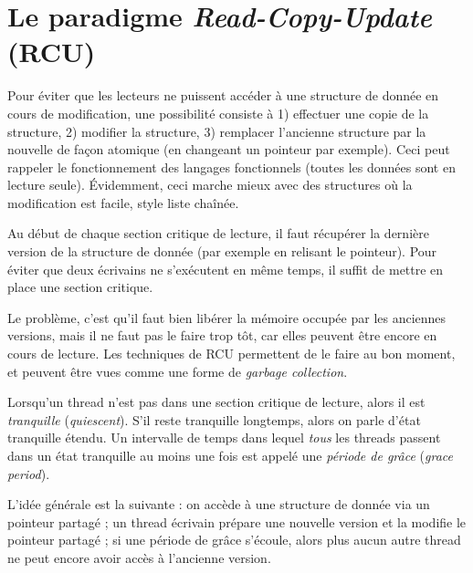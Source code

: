 \section{Le paradigme \emph{Read-Copy-Update} (RCU)}

Pour éviter que les lecteurs ne puissent accéder à une structure de donnée en
cours de modification, une possibilité consiste à 1) effectuer une copie de la
structure, 2) modifier la structure, 3) remplacer l'ancienne structure par la
nouvelle de façon atomique (en changeant un pointeur par exemple). Ceci peut
rappeler le fonctionnement des langages fonctionnels (toutes les données sont
\og en lecture seule\fg{}). Évidemment, ceci marche mieux avec des structures où
la modification est facile, style liste chaînée.

Au début de chaque section critique de lecture, il faut récupérer la dernière
version de la structure de donnée (par exemple en relisant le pointeur). Pour
éviter que deux écrivains ne s'exécutent en même temps, il suffit de mettre en
place une section critique.

Le problème, c'est qu'il faut bien libérer la mémoire occupée par les anciennes
versions, mais il ne faut pas le faire trop tôt, car elles peuvent être encore
en cours de lecture. Les techniques de RCU permettent de le faire au bon moment,
et peuvent être vues comme une forme de \emph{garbage collection}.

Lorsqu'un thread n'est pas dans une section critique de lecture, alors il est
\emph{tranquille} (\emph{quiescent}). S'il reste tranquille longtemps, alors on
parle d'état tranquille étendu. Un intervalle de temps dans lequel \emph{tous}
les threads passent dans un état tranquille au moins une fois est appelé une
\emph{période de grâce} (\emph{grace period}).

L'idée générale est la suivante : on accède à une structure de donnée via un
pointeur partagé ; un thread écrivain prépare une nouvelle version et la modifie
le pointeur partagé ; si une période de grâce s'écoule, alors plus aucun autre
thread ne peut encore avoir accès à l'ancienne version.

